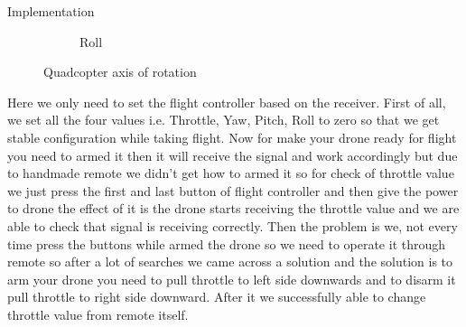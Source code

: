 \documentclass[12pt, oneside]{report}
\numberwithin{equation}{section}
\begin{document}
\begin{chapter}{Implementation}
\begin{figure}[h]
\begin{subfigure}[hb]{0.2\textwidth}
\caption{Roll}
\end{subfigure}
\caption{Quadcopter axis of rotation}
\end{figure}
%
Here we only need to set the flight controller based on the receiver. First of all, we set all the four values i.e. Throttle, Yaw, Pitch, Roll to zero so that we get stable configuration while taking flight. Now for make your drone ready for flight you need to armed it then it will receive the signal and work accordingly but due to handmade remote we didn’t get how to armed it so for check of throttle value we just press the first and last button of flight controller and then give the power to drone the effect of it is the drone starts receiving the throttle value and we are able to check that signal is receiving correctly. Then the problem is we, not every time press the buttons while armed the drone so we need to operate it through remote so after a lot of searches we came across a solution and the solution is to arm your drone you need to pull throttle to left side downwards and to disarm it pull throttle to right side downward. After it we successfully able to change throttle value from remote itself.


\end{chapter}
\end{document}
